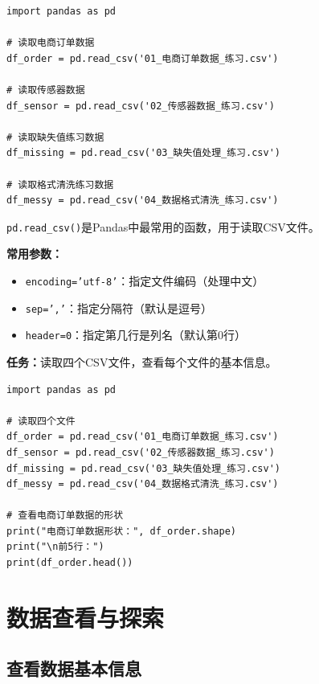 \documentclass[12pt,a4paper]{article}
\begin{document}
\begin{lstlisting}[caption={读取CSV文件}]
import pandas as pd

# 读取电商订单数据
df_order = pd.read_csv('01_电商订单数据_练习.csv')

# 读取传感器数据
df_sensor = pd.read_csv('02_传感器数据_练习.csv')

# 读取缺失值练习数据
df_missing = pd.read_csv('03_缺失值处理_练习.csv')

# 读取格式清洗练习数据
df_messy = pd.read_csv('04_数据格式清洗_练习.csv')
\end{lstlisting}

\begin{knowledgebox}
\texttt{pd.read\_csv()}是Pandas中最常用的函数，用于读取CSV文件。

\textbf{常用参数：}
\begin{itemize}
    \item \texttt{encoding='utf-8'}：指定文件编码（处理中文）
    \item \texttt{sep=','}：指定分隔符（默认是逗号）
    \item \texttt{header=0}：指定第几行是列名（默认第0行）
\end{itemize}
\end{knowledgebox}

\begin{practicebox}
\textbf{任务：}读取四个CSV文件，查看每个文件的基本信息。

\begin{lstlisting}
import pandas as pd

# 读取四个文件
df_order = pd.read_csv('01_电商订单数据_练习.csv')
df_sensor = pd.read_csv('02_传感器数据_练习.csv')
df_missing = pd.read_csv('03_缺失值处理_练习.csv')
df_messy = pd.read_csv('04_数据格式清洗_练习.csv')

# 查看电商订单数据的形状
print("电商订单数据形状：", df_order.shape)
print("\n前5行：")
print(df_order.head())
\end{lstlisting}
\end{practicebox}

\section{数据查看与探索}

\subsection{查看数据基本信息}
\end{document}
